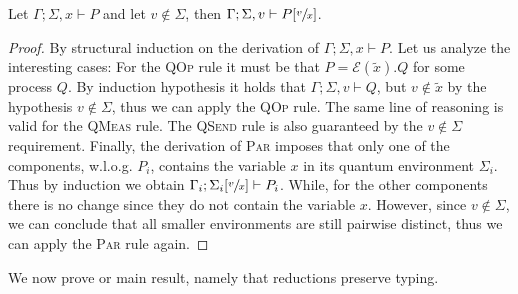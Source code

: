 \begin{theorem}
  Let $\Gamma; \Sigma, x \vdash P$ and let $v \not\in \Sigma$, then $\Gamma; \Sigma, v \vdash P[\sfrac{v}{x}]$.
\end{theorem}
\begin{proof}
  By structural induction on the derivation of $\Gamma; \Sigma, x \vdash P$.
  Let us analyze the interesting cases: For the \textsc{QOp} rule it must be that $P = \mathcal{E}(\widetilde{x}).Q$ for some process $Q$.
  By induction hypothesis it holds that $\Gamma; \Sigma, v \vdash Q$, but $v \not\in \widetilde{x}$ by the hypothesis $v \not\in \Sigma$, thus we can apply the \textsc{QOp} rule.
  The same line of reasoning is valid for the \textsc{QMeas} rule.
  The \textsc{QSend} rule is also guaranteed by the $v \not\in \Sigma$ requirement.
  Finally, the derivation of \textsc{Par} imposes that only one of the components, w.l.o.g. $P_i$, contains the variable $x$ in its quantum environment $\Sigma_i$.
  Thus by induction we obtain $\Gamma_i; \Sigma_i[\sfrac{v}{x}] \vdash P_i$. While, for the other components there is no change since they do not contain the variable $x$.
  However, since $v \not\in \Sigma$, we can conclude that all smaller environments are still pairwise distinct, thus we can apply the \textsc{Par} rule again.
\end{proof}

We now prove or main result, namely that reductions preserve typing.

